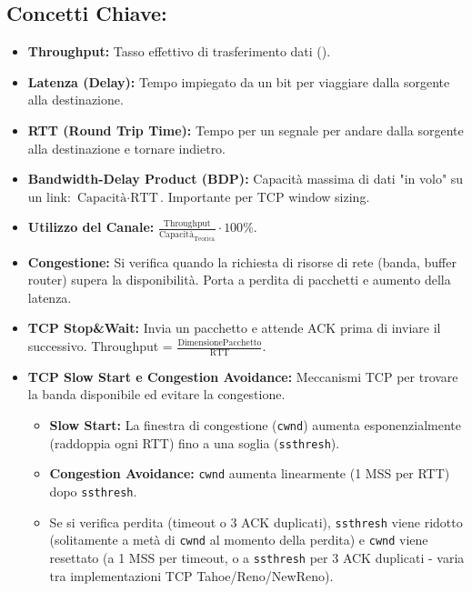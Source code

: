 \subsection{Concetti Chiave:}
\begin{itemize}
    \item \textbf{Throughput:} Tasso effettivo di trasferimento dati ().
    \item \textbf{Latenza (Delay):} Tempo impiegato da un bit per viaggiare dalla sorgente alla destinazione.
    \item \textbf{RTT (Round Trip Time):} Tempo per un segnale per andare dalla sorgente alla destinazione e tornare indietro.
    \item \textbf{Bandwidth-Delay Product (BDP):} Capacità massima di dati "in volo" su un link: $\text{Capacità} \cdot \text{RTT}$. Importante per TCP window sizing.
    \item \textbf{Utilizzo del Canale:} $\frac{\text{Throughput}}{\text{Capacità}_{\text{Teorica}}} \cdot 100\%$.
    \item \textbf{Congestione:} Si verifica quando la richiesta di risorse di rete (banda, buffer router) supera la disponibilità. Porta a perdita di pacchetti e aumento della latenza.
    \item \textbf{TCP Stop\&Wait:} Invia un pacchetto e attende ACK prima di inviare il successivo. Throughput = $\frac{\text{DimensionePacchetto}}{\text{RTT}}$.
    \item \textbf{TCP Slow Start e Congestion Avoidance:} Meccanismi TCP per trovare la banda disponibile ed evitare la congestione.
    \begin{itemize}
        \item \textbf{Slow Start:} La finestra di congestione (\texttt{cwnd}) aumenta esponenzialmente (raddoppia ogni RTT) fino a una soglia (\texttt{ssthresh}).
        \item \textbf{Congestion Avoidance:} \texttt{cwnd} aumenta linearmente (1 MSS per RTT) dopo \texttt{ssthresh}.
        \item Se si verifica perdita (timeout o 3 ACK duplicati), \texttt{ssthresh} viene ridotto (solitamente a metà di \texttt{cwnd} al momento della perdita) e \texttt{cwnd} viene resettato (a 1 MSS per timeout, o a \texttt{ssthresh} per 3 ACK duplicati - varia tra implementazioni TCP Tahoe/Reno/NewReno).
    \end{itemize}
\end{itemize}

